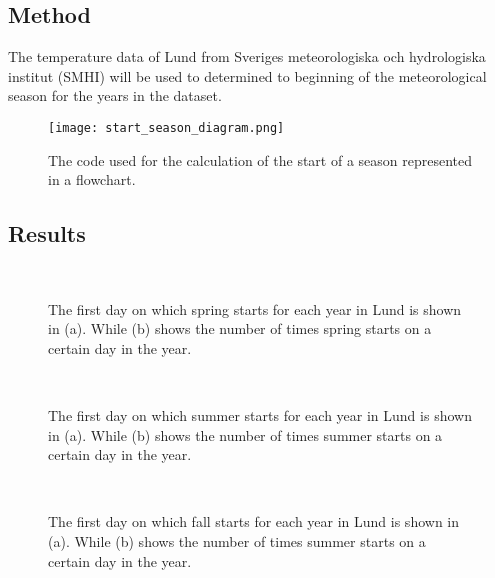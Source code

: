 \subsection{Method}
The temperature data of Lund from Sveriges meteorologiska och hydrologiska institut (SMHI) will be used to determined to beginning of the meteorological season for the years in the dataset.  


\begin{figure}[h!]
\centering
\texttt{[image: start\_season\_diagram.png]}
\caption{The code used for the calculation of the start of a season represented in a flowchart.}
\label{fig:flowchart}
\end{figure}
 

\subsection{Results}

\begin{figure}[ht!]
\centering
{} 
\\
\caption{The first day on which spring starts for each year in Lund is shown in (a).  While (b) shows the number of times spring starts on a certain day in the year.}
\label{fig:spring}
\end{figure}

\begin{figure}[ht!]
\centering
{} 
\\
\caption{The first day on which summer starts for each year in Lund is shown in (a).  While (b) shows the number of times summer starts on a certain day in the year.}
\label{fig:summer}
\end{figure}

\begin{figure}[ht!]
\centering
{} 
\\
\caption{The first day on which fall starts for each year in Lund is shown in (a).  While (b) shows the number of times summer starts on a certain day in the year.}
\label{fig:fall}
\end{figure}

